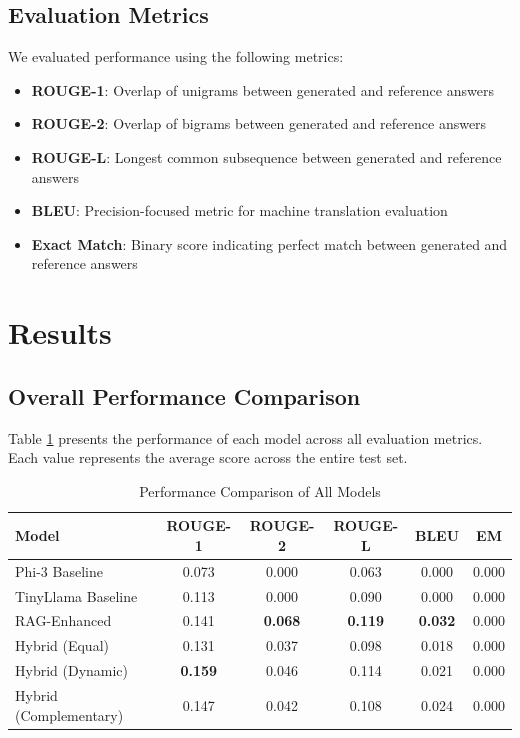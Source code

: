 \documentclass[conference]{IEEEtran}
\begin{document}
\subsection{Evaluation Metrics}
We evaluated performance using the following metrics:
\begin{itemize}
    \item \textbf{ROUGE-1}: Overlap of unigrams between generated and reference answers
    \item \textbf{ROUGE-2}: Overlap of bigrams between generated and reference answers
    \item \textbf{ROUGE-L}: Longest common subsequence between generated and reference answers
    \item \textbf{BLEU}: Precision-focused metric for machine translation evaluation
    \item \textbf{Exact Match}: Binary score indicating perfect match between generated and reference answers
\end{itemize}

\section{Results}

\subsection{Overall Performance Comparison}
Table \ref{tab:performance} presents the performance of each model across all evaluation metrics. Each value represents the average score across the entire test set.

\begin{table}[h]
\centering
\caption{Performance Comparison of All Models}
\label{tab:performance}
\begin{tabular}{lccccc}
\toprule
\textbf{Model} & \textbf{ROUGE-1} & \textbf{ROUGE-2} & \textbf{ROUGE-L} & \textbf{BLEU} & \textbf{EM} \\
\midrule
Phi-3 Baseline & 0.073 & 0.000 & 0.063 & 0.000 & 0.000 \\
TinyLlama Baseline & 0.113 & 0.000 & 0.090 & 0.000 & 0.000 \\
RAG-Enhanced & 0.141 & \textbf{0.068} & \textbf{0.119} & \textbf{0.032} & 0.000 \\
Hybrid (Equal) & 0.131 & 0.037 & 0.098 & 0.018 & 0.000 \\
Hybrid (Dynamic) & \textbf{0.159} & 0.046 & 0.114 & 0.021 & 0.000 \\
Hybrid (Complementary) & 0.147 & 0.042 & 0.108 & 0.024 & 0.000 \\
\bottomrule
\end{tabular}
\end{table}
\end{document}
